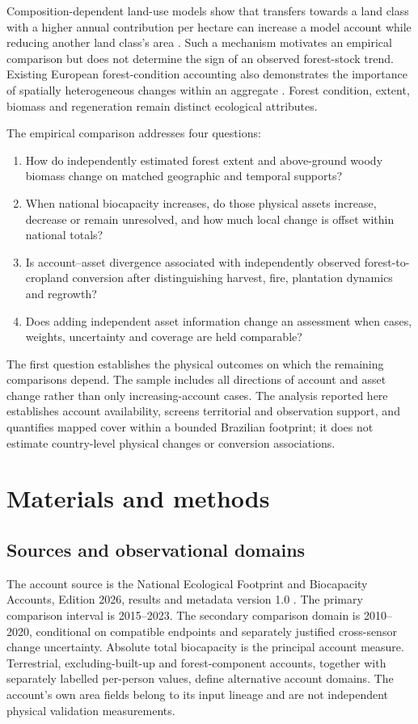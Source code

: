 \documentclass[11pt,a4paper]{article}
\begin{document}
Composition-dependent land-use models show that transfers towards a land class with a higher annual contribution per hectare can increase a model account while reducing another land class's area \citep{Abaee2026}. Such a mechanism motivates an empirical comparison but does not determine the sign of an observed forest-stock trend. Existing European forest-condition accounting also demonstrates the importance of spatially heterogeneous changes within an aggregate \citep{Maes2023}. Forest condition, extent, biomass and regeneration remain distinct ecological attributes.

The empirical comparison addresses four questions:
\begin{enumerate}
\item How do independently estimated forest extent and above-ground woody biomass change on matched geographic and temporal supports?
\item When national biocapacity increases, do those physical assets increase, decrease or remain unresolved, and how much local change is offset within national totals?
\item Is account--asset divergence associated with independently observed forest-to-cropland conversion after distinguishing harvest, fire, plantation dynamics and regrowth?
\item Does adding independent asset information change an assessment when cases, weights, uncertainty and coverage are held comparable?
\end{enumerate}
The first question establishes the physical outcomes on which the remaining comparisons depend. The sample includes all directions of account and asset change rather than only increasing-account cases. The analysis reported here establishes account availability, screens territorial and observation support, and quantifies mapped cover within a bounded Brazilian footprint; it does not estimate country-level physical changes or conversion associations.

\section{Materials and methods}
\subsection{Sources and observational domains}
The account source is the National Ecological Footprint and Biocapacity Accounts, Edition 2026, results and metadata version 1.0 \citep{Lo2026}. The primary comparison interval is 2015--2023. The secondary comparison domain is 2010--2020, conditional on compatible endpoints and separately justified cross-sensor change uncertainty. Absolute total biocapacity is the principal account measure. Terrestrial, excluding-built-up and forest-component accounts, together with separately labelled per-person values, define alternative account domains. The account's own area fields belong to its input lineage and are not independent physical validation measurements.
\end{document}

